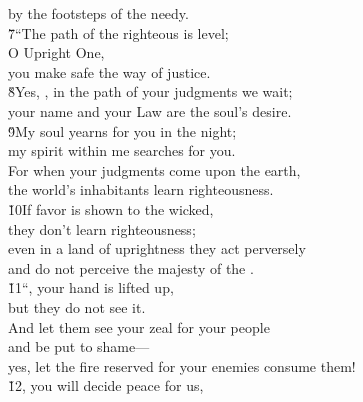 \begin{poetry}
\poeml by the footsteps of the needy. \\
\poeml \v{7}``The path of the righteous is level; \\
\poemll    O Upright One, \\
\poemlll       you make safe the way of justice. \\
\poeml \v{8}Yes, , in the path of your judgments we wait; \\
\poemll    your name and your Law are the soul's desire. \\
\poeml \v{9}My soul yearns for you in the night; \\
\poemll    my spirit within me searches for you. \\
\poeml For when your judgments come upon the earth, \\
\poemll    the world's inhabitants learn righteousness. \\
\poeml \v{10}If favor is shown to the wicked, \\
\poemll    they don't learn righteousness; \\
\poeml even in a land of uprightness they act perversely \\
\poemll    and do not perceive the majesty of the . \\
\poeml \v{11}``, your hand is lifted up, \\
\poemll    but they do not see it. \\
\poeml And let them see your zeal for your people \\
\poemll    and be put to shame--- \\
\poemlll       yes, let the fire reserved for your enemies consume them! \\
\poeml \v{12}, you will decide peace for us, \\

\end{poetry}

